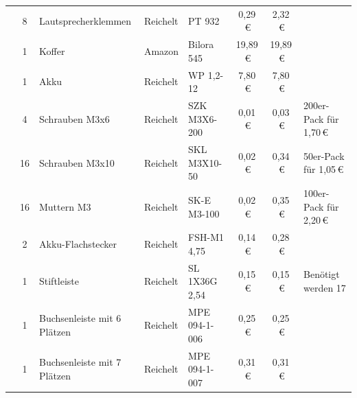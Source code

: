 \documentclass[paper=a4, parskip, numbers=noenddot, toc=listof, headsepline]{scrbook}
\begin{document}
{\begin{longtable}{p{1.2cm}cp{2.5cm}llSSp{2.35cm}}
				                                    & 8    & Laut\-sprech\-er\-klem\-men               & Reichelt   & PT 932                                                               & 0,29\,€  & 2,32\,€  &                        \\
				                                    & 1    & Koffer                                    & Amazon     & Bilora 545                                                           & 19,89\,€ & 19,89\,€ &                        \\
				                                    & 1    & Akku                                      & Reichelt   & WP 1,2-12                                                            & 7,80\,€  & 7,80\,€  &                        \\
				                                    & 4    & Schrauben M3x6                            & Reichelt   & SZK M3X6-200                                                         & 0,01\,€  & 0,03\,€  & 200er-Pack für 1,70\,€ \\
				                                    & 16   & Schrauben M3x10                           & Reichelt   & SKL M3X10-50                                                         & 0,02\,€  & 0,34\,€  & 50er-Pack für 1,05\,€  \\
				                                    & 16   & Muttern M3                                & Reichelt   & SK-E M3-100                                                          & 0,02\,€  & 0,35\,€  & 100er-Pack für 2,20\,€ \\
				                                    & 2    & Akku-Flachstecker                         & Reichelt   & FSH-M1 4,75                                                          & 0,14\,€  & 0,28\,€  &                        \\
				                                    & 1    & Stiftleiste                               & Reichelt   & SL 1X36G 2,54                                                        & 0,15\,€  & 0,15\,€  & Benötigt werden 17     \\
				                                    & 1    & Buchsenleiste mit 6 Plätzen               & Reichelt   & MPE 094-1-006                                                        & 0,25\,€  & 0,25\,€  &                        \\
				                                    & 1    & Buchsenleiste mit 7 Plätzen               & Reichelt   & MPE 094-1-007                                                        & 0,31\,€  & 0,31\,€  &                        \\

\end{longtable}}
\end{document}
